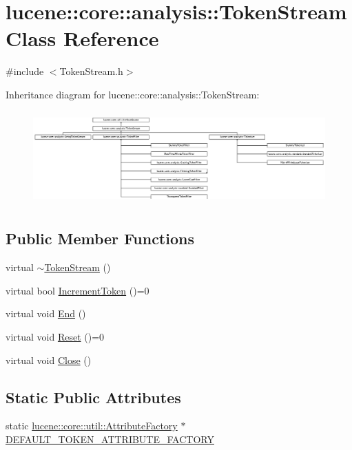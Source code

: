 \hypertarget{classlucene_1_1core_1_1analysis_1_1TokenStream}{}\section{lucene\+:\+:core\+:\+:analysis\+:\+:Token\+Stream Class Reference}
\label{classlucene_1_1core_1_1analysis_1_1TokenStream}


{\ttfamily \#include $<$Token\+Stream.\+h$>$}

Inheritance diagram for lucene\+:\+:core\+:\+:analysis\+:\+:Token\+Stream\+:\begin{figure}[H]
\begin{center}
\leavevmode
\includegraphics[height=3.624595cm]{classlucene_1_1core_1_1analysis_1_1TokenStream}
\end{center}
\end{figure}
\subsection*{Public Member Functions}
\begin{DoxyCompactItemize}
\item 
virtual \mbox{\hyperlink{classlucene_1_1core_1_1analysis_1_1TokenStream_a16519782e35e74b26236c729c6b94f8c}{$\sim$\+Token\+Stream}} ()
\item 
virtual bool \mbox{\hyperlink{classlucene_1_1core_1_1analysis_1_1TokenStream_a614d4ea24a354d6f4354b4941b5124e2}{Increment\+Token}} ()=0
\item 
virtual void \mbox{\hyperlink{classlucene_1_1core_1_1analysis_1_1TokenStream_a4693985ca7fb242412049a074027b8b5}{End}} ()
\item 
virtual void \mbox{\hyperlink{classlucene_1_1core_1_1analysis_1_1TokenStream_ae24622f4bc0aeaf0bef924ff1661e023}{Reset}} ()=0
\item 
virtual void \mbox{\hyperlink{classlucene_1_1core_1_1analysis_1_1TokenStream_ad7963391ddbb2c75610e3738ba5155c8}{Close}} ()
\end{DoxyCompactItemize}
\subsection*{Static Public Attributes}
\begin{DoxyCompactItemize}
\item 
static \mbox{\hyperlink{classlucene_1_1core_1_1util_1_1AttributeFactory}{lucene\+::core\+::util\+::\+Attribute\+Factory}} $\ast$ \mbox{\hyperlink{classlucene_1_1core_1_1analysis_1_1TokenStream_a3a38785c7907943994326cb9d7180671}{D\+E\+F\+A\+U\+L\+T\+\_\+\+T\+O\+K\+E\+N\+\_\+\+A\+T\+T\+R\+I\+B\+U\+T\+E\+\_\+\+F\+A\+C\+T\+O\+RY}}
\end{DoxyCompactItemize}

